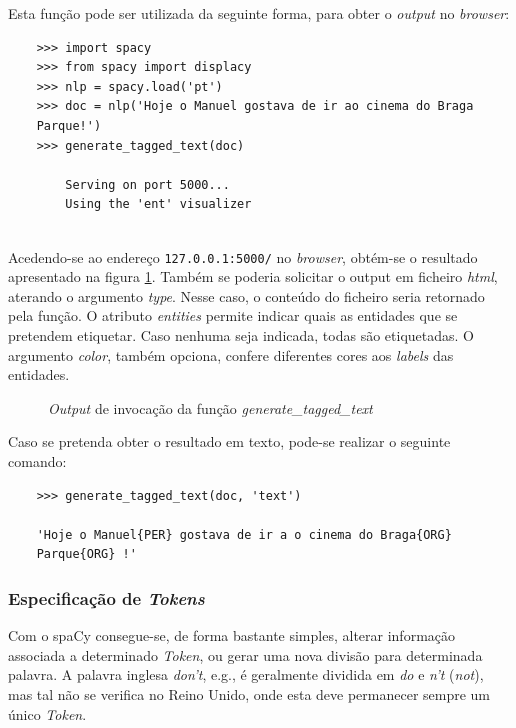 \documentclass[12pt]{article}
\begin{document}
Esta função pode ser utilizada da seguinte forma, para obter o \textit{output} no \textit{browser}:

\begin{verbatim}
	>>> import spacy
	>>> from spacy import displacy
	>>> nlp = spacy.load('pt')
	>>> doc = nlp('Hoje o Manuel gostava de ir ao cinema do Braga
	Parque!')
	>>> generate_tagged_text(doc)

		Serving on port 5000...
		Using the 'ent' visualizer
	
\end{verbatim}

Acedendo-se ao endereço \texttt{127.0.0.1:5000/} no \textit{browser}, obtém-se o resultado apresentado na figura \ref{figure:ent-tagger}. Também se poderia solicitar o output em ficheiro \textit{html}, aterando o argumento \textit{type}. Nesse caso, o conteúdo do ficheiro seria retornado pela função. O atributo \textit{entities} permite indicar quais as entidades que se pretendem etiquetar. Caso nenhuma seja indicada, todas são etiquetadas. O argumento \textit{color}, também opciona, confere diferentes cores aos \textit{labels} das entidades.


\begin{figure}[!ht]
	\centering
	\setlength{\abovecaptionskip}{-.5cm}
	\caption{\textit{Output} de invocação da função \textit{generate\_tagged\_text}}
	\label{figure:ent-tagger}
\end{figure}

Caso se pretenda obter o resultado em texto, pode-se realizar o seguinte comando:

\begin{verbatim}
	>>> generate_tagged_text(doc, 'text')
	
	'Hoje o Manuel{PER} gostava de ir a o cinema do Braga{ORG}
	Parque{ORG} !'

\end{verbatim}


\subsubsection{Especificação de \textit{Tokens}}

Com o spaCy consegue-se, de forma bastante simples, alterar informação associada a determinado \textit{Token}, ou gerar uma nova divisão para determinada palavra. A palavra inglesa \textit{don't}, e.g., é geralmente dividida em \textit{do} e \textit{n't} (\textit{not}), mas tal não se verifica no Reino Unido, onde esta deve permanecer sempre um único \textit{Token}.
\end{document}
